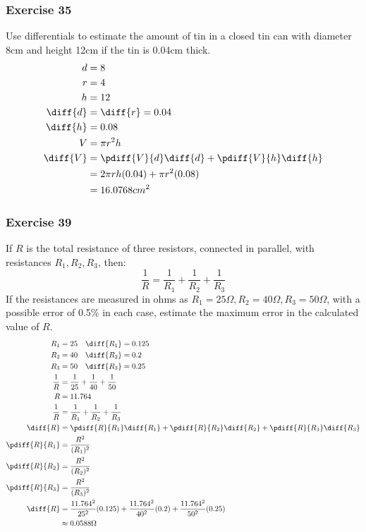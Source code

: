 \documentclass{math}
\begin{document}
\subsubsection*{Exercise 35}
Use differentials to estimate the amount of tin in a closed tin can with
diameter 8cm and height 12cm if the tin is 0.04cm thick.
\begin{align*}
  d &= 8 \\
  r &= 4 \\
  h &= 12 \\
  \diff{d} &= \diff{r} = 0.04 \\
  \diff{h} &= 0.08 \\
  V &= \pi r^2h \\
  \diff{V} &= \pdiff{V}{d}\diff{d}+\pdiff{V}{h}\diff{h} \\
  &= 2\pi rh(0.04)+\pi r^2(0.08) \\
  &= 16.0768cm^2
\end{align*}

\subsubsection*{Exercise 39}
If \( R \) is the total resistance of three resistors, connected in parallel,
with resistances \( R_1,R_2,R_3 \), then:
\[ \frac{1}{R} = \frac{1}{R_1}+\frac{1}{R_2}+\frac{1}{R_3} \]
If the resistances are measured in ohms as \( R_1 = 25\Omega, R_2 = 40\Omega,
R_3 = 50\Omega \), with a possible error of 0.5\% in each case, estimate the
maximum error in the calculated value of \( R \).
\begin{align*}
  R_1 &= 25 \quad \diff{R_1} = 0.125 \\
  R_2 &= 40 \quad \diff{R_2} = 0.2 \\
  R_3 &= 50 \quad \diff{R_3} = 0.25 \\
  \frac{1}{R} &= \frac{1}{25}+\frac{1}{40}+\frac{1}{50} \\
  R &= 11.764 \\
  \frac{1}{R} &= \frac{1}{R_1}+\frac{1}{R_2}+\frac{1}{R_3} \\
  \diff{R} &= \pdiff{R}{R_1}\diff{R_1}+\pdiff{R}{R_2}\diff{R_2}+
    \pdiff{R}{R_3}\diff{R_3} \\
  \pdiff{R}{R_1} &= \frac{R^2}{(R_1)^2} \\
  \pdiff{R}{R_2} &= \frac{R^2}{(R_2)^2} \\
  \pdiff{R}{R_3} &= \frac{R^2}{(R_3)^2} \\
  \diff{R} &= \frac{11.764^2}{25^2}(0.125)+\frac{11.764^2}{40^2}(0.2)+
    \frac{11.764^2}{50^2}(0.25) \\
  &\approx 0.0588\Omega
\end{align*}
\end{document}
